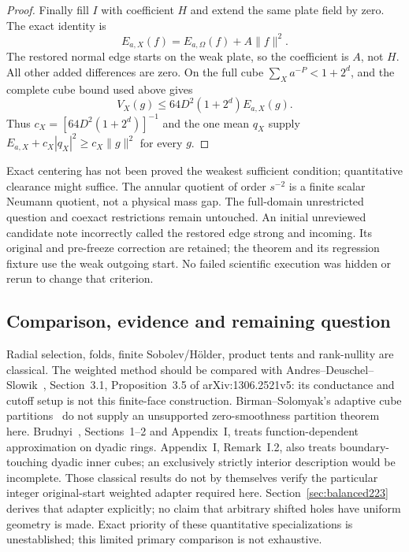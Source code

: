 \begin{proof}
Finally fill $I$ with coefficient $H$ and extend the same plate field
by zero. The exact identity is
\[
 E_{a,X}(f)=E_{a,\Omega}(f)+A\|f\|^2.
\]
The restored normal edge starts on the weak plate, so the coefficient
is $A$, not $H$. All other added differences are zero. On the full
cube $\sum_Xa^{-P}<1+2^d$, and the complete cube bound used above gives
\[
 V_X(g)\le64D^2(1+2^d)E_{a,X}(g).
\]
Thus $c_X=[64D^2(1+2^d)]^{-1}$ and the one mean $q_X$ supply
$E_{a,X}+c_X|q_X|^2\ge c_X\|g\|^2$ for every $g$.
\end{proof}

Exact centering has not been proved the weakest sufficient condition;
quantitative clearance might suffice. The annular quotient of order
$s^{-2}$ is a finite scalar Neumann quotient, not a physical mass gap.
The full-domain unrestricted question and coexact restrictions remain
untouched. An initial unreviewed candidate note incorrectly called the
restored edge strong and incoming. Its original and pre-freeze correction
are retained; the theorem and its regression fixture use the weak outgoing
start. No failed scientific execution was hidden or rerun to change that
criterion.

\subsection{Comparison, evidence and remaining question}
Radial selection, folds, finite Sobolev/H\"older, product tents and
rank-nullity are classical. The weighted method should be compared with
Andres--Deuschel--Slowik~\cite{ads221}, Section~3.1, Proposition~3.5 of arXiv:1306.2521v5: its conductance and cutoff setup is not this finite-face
construction. Birman--Solomyak's adaptive cube partitions~\cite{birman221} do not supply
an unsupported zero-smoothness partition theorem here.
Brudnyi~\cite{brudnyi221}, Sections~1--2 and Appendix~I, treats
function-dependent approximation on dyadic rings. Appendix~I, Remark~I.2,
also treats boundary-touching dyadic inner cubes; an exclusively strictly
interior description would be incomplete. Those classical results do not by
themselves verify the particular integer original-start weighted adapter
required here. Section~\ref{sec:balanced223} derives that adapter explicitly;
no claim that arbitrary shifted holes have uniform geometry is made. Exact priority of these quantitative specializations
is unestablished; this limited primary comparison is not exhaustive.

